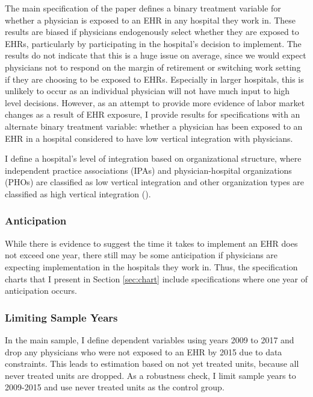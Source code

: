 \documentclass[12pt]{article}
\begin{document}
The main specification of the paper defines a binary treatment variable for whether a physician is exposed to an EHR in any hospital they work in. These results are biased if physicians endogenously select whether they are exposed to EHRs, particularly by participating in the hospital's decision to implement. The results do not indicate that this is a huge issue on average, since we would expect physicians not to respond on the margin of retirement or switching work setting if they are choosing to be exposed to EHRs. Especially in larger hospitals, this is unlikely to occur as an individual physician will not have much input to high level decisions. However, as an attempt to provide more evidence of labor market changes as a result of EHR exposure, I provide results for specifications with an alternate binary treatment variable: whether a physician has been exposed to an EHR in a hospital considered to have low vertical integration with physicians. 

I define a hospital's level of integration based on organizational structure, where independent practice associations (IPAs) and physician-hospital organizations (PHOs) are classified as low vertical integration and other organization types are classified as high vertical integration (\cite{dynan1998assessing}). 



\subsubsection{Anticipation}\label{app:anticipation}

While there is evidence to suggest the time it takes to implement an EHR does not exceed one year, there still may be some anticipation if physicians are expecting implementation in the hospitals they work in. Thus, the specification charts that I present in Section \ref{sec:chart} include specifications where one year of anticipation occurs. 

\subsubsection{Limiting Sample Years}\label{app:years}

In the main sample, I define dependent variables using years 2009 to 2017 and drop any physicians who were not exposed to an EHR by 2015 due to data constraints. This leads to estimation based on not yet treated units, because all never treated units are dropped. As a robustness check, I limit sample years to 2009-2015 and use never treated units as the control group. 
\end{document}
